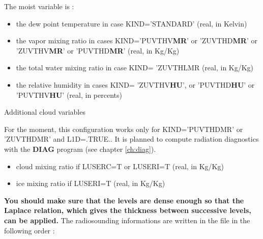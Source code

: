 The moist variable is  :

\begin{itemize}
\item the dew point temperature in case KIND='STANDARD' (real, in Kelvin) 
\item the vapor mixing ratio
 in cases KIND='PUVTHV{\bf MR}' or 'ZUVTHD{\bf MR}' or 
'ZUVTHV{\bf MR}' or 'PUVTHD{\bf MR}' (real, in Kg/Kg) 
\item the total water  mixing ratio  in case KIND= 'ZUVTHLMR (real, in Kg/Kg)
\item  the relative humidity in cases KIND= 'ZUVTHV{\bf HU}', or 'PUVTHD{\bf HU}' or 'PUVTHV{\bf HU}' (real, in
percents)
\end{itemize}

Additional cloud variables

For the moment, this configuration works only for  KIND='PUVTHDMR' or 'ZUVTHDMR'
and  L1D=.TRUE.. It is planned to compute radiation
diagnostics with the {\bf DIAG} program (see chapter \ref{ch:diag}).

\begin{itemize}
\item
cloud mixing ratio if LUSERC=T or LUSERI=T (real, in Kg/Kg) 
\item
ice  mixing ratio if  LUSERI=T (real, in Kg/Kg) 
\end{itemize}

\vspace{0.5cm}

{\bf You should make sure that the levels are dense enough so that the Laplace
relation, which gives the thickness between successive levels, can be applied.}
The radiosounding informations are written in the file  in the following order :


